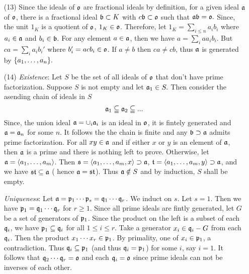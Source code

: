 \documentclass{article}
\theoremstyle{definition}
\theoremstyle{remark}
\begin{document}
\begin{enumerate}
        \newcommand{\io}{\I o}
        \newcommand{\ia}{\I a}
        \newcommand{\ib}{\I b}
        \newcommand{\ic}{\I c}
        \newcommand{\ip}{\I p}
        \newcommand{\iq}{\I q}
  \item[(13)] Since the ideals of $\io$ are fractional ideals by definition, for a given ideal $\ia$ of $\io$, there is a fractional ideal $\ib \subset K$ with $c\ib \subset \io$ such that $\ia \ib = \io.$ Since, the unit $1_K$ is a quotient of $\io$, $1_K \in \io$. Therefore, let $1_K = \sum_{i \leq n} a_ib_i$ where $a_i \in \ia$ and $b_i \in \ib.$ For any element $a \in \ia$, then we have $a = \sum_{i} aa_ib_i$. But $ca = \sum_i a_ib_i'$ where $b_i' = acb_i \in \io$. If $a \neq b$ then $ca \neq cb$, thus $\ia$ is generated by $\{a_1, \dots, a_n\}.$

  \item[(14)]  \textit{Existence}: Let $S$ be the set of all ideals of $\io$ that don't have prime factorization. Suppose $S$ is not empty and let $\ia_1  \in S.$ Then consider the asending chain of ideals in $S$
        $$\ia_1 \subseteqq \ia_2 \subseteqq ... $$
        Since, the union ideal $\ia =  \cup_i \ia_i$ is an ideal in $\io$, it is fintely generated and  $\ia = \ia_n$ for some $n$. It follows the the chain is finite and any $\ib \supset \ia$ admits prime factorization. For all $xy \in \ia$ and if either $x$ or $y$ is an element of $\ia$, then $\ia$ is a prime and there is nothing left to prove. Otherwise, let $\ia = \gen{a_1, \dots, a_m}$. Then $\I s = \gen{a_1, \dots, a_m, x} \supset \ia$, $\I t = \gen{a_1, \dots, a_m, y} \supset \ia$, and we have $\I s\I t \subseteq \ia$ ( hence $\ia = \I s\I t$). Thus $\ia \notin S$ and by induction, $S$ shall be empty.

        \textit{Uniqueness}: Let $\ia = \ip_1 \cdots \ip_s = \iq_1 \cdots \iq_r$. We induct on $s$. Let $s = 1$. Then we have $\ip_1 = \iq_1 \cdots \iq_r$ for $r \geq 1$. Since all prime ideals are fintly generated, let $G$ be a set of generators of $\ip_1$. Since the product on the left is a subset of each $\iq_i$, we have $\ip_1 \subseteq \iq_i$ for all $1 \leq i \leq r$. Take a generator $x_i \in \iq_i - G$ from each $\iq_i$. Then the product $x_1 \cdots x_r \in \ip_1$. By primality, one of $x_i \in \ip_1$, a contradiction. Thus  $\iq_i \subseteq \ip_1$ (and thus $\iq_i = \ip_1$) for some $i$, say $i = 1$. It follows that $\iq_2 \cdots \iq_r = \io$ and each $\iq_i = \io$ since prime ideals can not be inverses of each other.


\end{enumerate}
\end{document}
